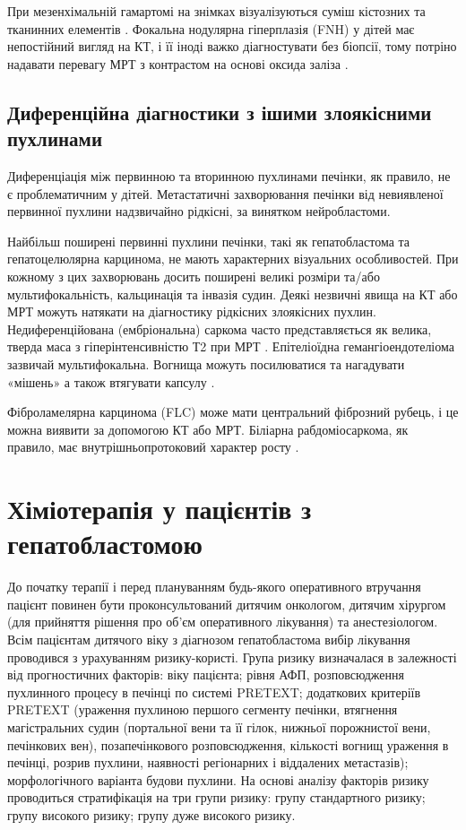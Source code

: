 При мезенхімальній гамартомі на знімках візуалізуються суміш кістозних та тканинних елементів \cite{pmid21621153}. Фокальна нодулярна гіперплазія (FNH) у дітей має непостійний вигляд на КТ, і її іноді важко діагностувати без біопсії, тому потріно надавати перевагу МРТ з контрастом на основі оксида заліза \cite{pmid21830412}.

\subsection{Диференційна діагностики з ішими злоякісними пухлинами}
Диференціація між первинною та вторинною пухлинами печінки, як правило, не є проблематичним у дітей. Метастатичні захворювання печінки від невиявленої первинної пухлини надзвичайно рідкісні, за винятком нейробластоми.

Найбільш поширені первинні пухлини печінки, такі як гепатобластома та гепатоцелюлярна карцинома, не мають характерних візуальних особливостей. При кожному з цих захворювань досить поширені великі розміри та/або мультифокальність, кальцинація та інвазія судин. Деякі незвичні явища на КТ або МРТ можуть натякати на діагностику рідкісних злоякісних пухлин. Недиференційована (ембріональна) саркома часто представляється як велика, тверда маса з гіперінтенсивністю Т2 при МРТ \cite{pmid22201955}. Епітеліоїдна гемангіоендотеліома зазвичай мультифокальна. Вогнища можуть посилюватися та нагадувати «мішень» а також втягувати капсулу \cite{pmid22648963}.

Фіброламелярна карцинома (FLC) може мати центральний фіброзний рубець, і це можна виявити за допомогою КТ або МРТ. Біліарна рабдоміосаркома, як правило, має внутрішньопротоковий характер росту \cite{pmid22648979}.

\section{Хіміотерапія у пацієнтів з гепатобластомою}
До початку терапії і перед плануванням будь-якого оперативного втручання пацієнт повинен бути проконсультований дитячим онкологом, дитячим хірургом (для прийняття рішення про об’єм оперативного лікування) та анестезіологом.
Всім пацієнтам дитячого віку з діагнозом гепатобластома вибір лікування проводився з урахуванням ризику-користі. Група ризику визначалася в залежності від прогностичних факторів: віку пацієнта; рівня АФП, розповсюдження пухлинного процесу в печінці по системі PRETEXT; додаткових критеріїв PRETEXT (ураження пухлиною першого сегменту печінки, втягнення магістральних судин (портальної вени та її гілок, нижньої порожнистої вени, печінкових вен), позапечінкового розповсюдження, кількості вогнищ ураження в печінці, розрив пухлини, наявності регіонарних і віддалених метастазів); морфологічного варіанта будови пухлини. На основі аналізу факторів ризику проводиться стратифікація на три групи ризику: групу стандартного ризику; групу високого ризику; групу дуже високого ризику\cite{pmid24759227}.

